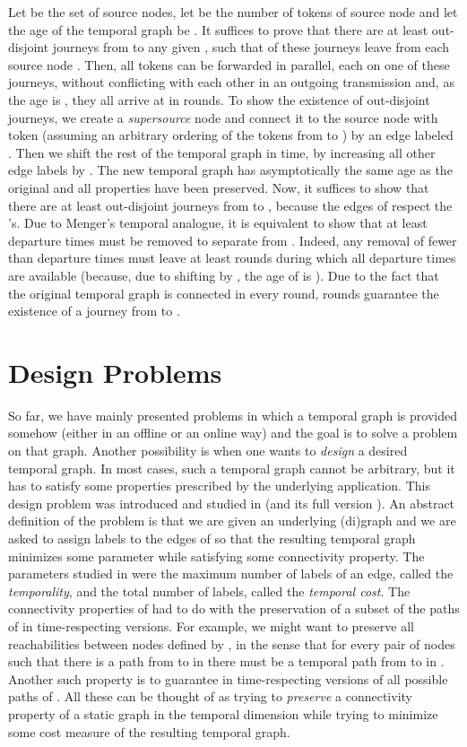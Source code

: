 \documentclass[oribibl, 11pt]{llncs}
\begin{document}
Let  be the set of source nodes, let  be the number of tokens of source node  and let the age of the temporal graph be . It suffices to prove that there are at least  out-disjoint journeys from  to any given , such that  of these journeys leave from each source node . Then, all tokens can be forwarded in parallel, each on one of these journeys, without conflicting with each other in an outgoing transmission and, as the age is , they all arrive at  in  rounds. To show the existence of  out-disjoint journeys, we create a \emph{supersource} node  and connect it to the source node with token  (assuming an arbitrary ordering of the tokens from  to ) by an edge labeled . Then we shift the rest of the temporal graph in time, by increasing all other edge labels by . The new temporal graph  has asymptotically the same age as the original and all properties have been preserved. Now, it suffices to show that there are at least  out-disjoint journeys from  to , because the  edges of  respect the 's. Due to Menger's temporal analogue, it is equivalent to show that at least  departure times must be removed to separate  from . Indeed, any removal of fewer than  departure times must leave at least  rounds during which all departure times are available (because, due to shifting by , the age of  is ). Due to the fact that the original temporal graph is connected in every round,  rounds guarantee the existence of a journey from  to . 

\section{Design Problems}
\label{sec:design}

So far, we have mainly presented problems in which a temporal graph is provided somehow (either in an offline or an online way) and the goal is to solve a problem on that graph. Another possibility is when one wants to \emph{design} a desired temporal graph. In most cases, such a temporal graph cannot be arbitrary, but it has to satisfy some properties prescribed by the underlying application. This design problem was introduced and studied in \cite{MMCS13} (and its full version \cite{MMS15}). An abstract definition of the problem is that we are given an underlying (di)graph  and we are asked to assign labels to the edges of  so that the resulting temporal graph  minimizes some parameter while satisfying some connectivity property. The parameters studied in \cite{MMCS13} were the maximum number of labels of an edge, called the \emph{temporality}, and the total number of labels, called the \emph{temporal cost}. The connectivity properties of \cite{MMCS13} had to do with the preservation of a subset of the paths of  in time-respecting versions. For example, we might want to preserve all reachabilities between nodes defined by , in the sense that for every pair of nodes  such that there is a path from  to  in  there must be a temporal path from  to  in . Another such property is to guarantee in  time-respecting versions of all possible paths of . All these can be thought of as trying to \emph{preserve} a connectivity property of a static graph in the temporal dimension while trying to minimize some cost measure of the resulting temporal graph. 
\end{document}
